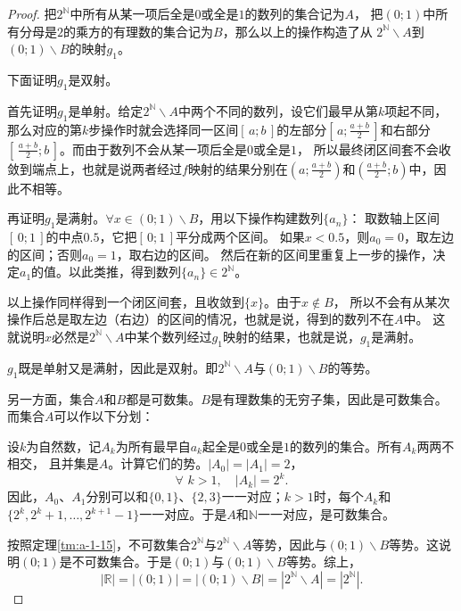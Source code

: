 \documentclass[12pt,UTF8,fontset=none]{ctexbook}
\begin{document}
\begin{appendix}
\begin{proof}
    把$2^\mathbb{N}$中所有从某一项后全是$0$或全是$1$的数列的集合记为$A$，
    把$(0;1)$中所有分母是$2$的乘方的有理数的集合记为$B$，那么以上的操作构造了从
    $2^\mathbb{N}\backslash A$到$(0;1)\backslash B$的映射$g_1$。

    下面证明$g_1$是双射。

    首先证明$g_1$是单射。给定$2^\mathbb{N}\backslash A$中两个不同的数列，设它们最早从第$k$项起不同，
    那么对应的第$k$步操作时就会选择同一区间$[\,a; b\,]$的左部分$[\,a;\frac{a+b}{2}\,]$和右部分$[\,\frac{a+b}{2};b\,]$。而由于数列不会从某一项后全是$0$或全是$1$，
    所以最终闭区间套不会收敛到端点上，也就是说两者经过$f$映射的结果分别在$(a;\frac{a+b}{2})$和$(\frac{a+b}{2};b)$中，因此不相等。

    再证明$g_1$是满射。$\forall x \in (0;1)\backslash B$，用以下操作构建数列$\{a_n\}$：
    取数轴上区间$[\,0;1\,]$的中点$0.5$，它把$[\,0;1\,]$平分成两个区间。
    如果$x<0.5$，则$a_0=0$，取左边的区间；否则$a_0=1$，取右边的区间。
    然后在新的区间里重复上一步的操作，决定$a_1$的值。以此类推，得到数列$\{a_n\}\in 2^\mathbb{N}$。

    以上操作同样得到一个闭区间套，且收敛到$\{x\}$。由于$x\notin B$，
    所以不会有从某次操作后总是取左边（右边）的区间的情况，也就是说，得到的数列不在$A$中。
    这就说明$x$必然是$2^\mathbb{N}\backslash A$中某个数列经过$g_1$映射的结果，也就是说，$g_1$是满射。
    
    $g_1$既是单射又是满射，因此是双射。即$2^\mathbb{N}\backslash A$与$(0;1)\backslash B$的等势。

    另一方面，集合$A$和$B$都是可数集。$B$是有理数集的无穷子集，因此是可数集合。
    而集合$A$可以作以下分划：

    设$k$为自然数，记$A_k$为所有最早自$a_k$起全是$0$或全是$1$的数列的集合。所有$A_k$两两不相交，
    且并集是$A$。计算它们的势。$|A_0| = |A_1| = 2$，
    $$ \forall \,\, k > 1, \quad |A_k| = 2^k. $$
    因此，$A_0$、$A_1$分别可以和$\{0,1\}$、$\{2,3\}$一一对应；$k>1$时，每个$A_k$和$\{2^k,2^k+1,\ldots, 2^{k+1}-1\}$一一对应。于是$A$和$\mathbb{N}$一一对应，是可数集合。

    按照定理\ref{tm:a-1-15}，不可数集合$2^\mathbb{N}$与$2^\mathbb{N}\backslash A$等势，因此与$(0;1)\backslash B$等势。这说明$(0;1)$是不可数集合。于是$(0;1)$与$(0;1)\backslash B$等势。综上，
    $$ |\mathbb{R}| = |(0;1)| = |(0;1)\backslash B| = |2^\mathbb{N}\backslash A| = |2^\mathbb{N}|. $$


\end{proof}
\end{appendix}
\end{document}
